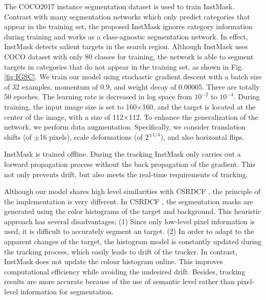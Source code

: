 \documentclass[review]{elsarticle}
\begin{document}
\begin{CJK*}{UTF8}{gbsn}
The COCO2017 \cite{Lin2014MicrosoftCC} instance segmentation dataset is used to train InstMask.
Contrast with many segmentation networks which only predict categories that appear in the training set, the proposed InstMask ignores category information during training and works as a class-agnostic segmentation network. In effect, InstMask detects salient targets in the search region. Although InstMask uses COCO dataset \cite{Lin2014MicrosoftCC} with only 80 classes for training, the network is able to segment targets in categories that do not appear in the training set, as shown in Fig. \ref{fig:IGSC}.
We train our model using stochastic gradient descent with a batch size of 32 examples, momentum of 0.9, and weight decay of 0.00005. There are totally 50 epoches. The learning rate is decreased in log space from $10^{-2}$ to $10^{-4}$. During training, the input image size is set to 160$\times$160, and the target is located at the center of the image, with a size of 112$\times$112. To enhance the generalization of the network, we perform data augmentation. Specifically, we consider translation shifts (of $\pm$16 pixels), scale deformations (of $2^{\pm 1/4}$), and also horizontal flips.

InstMask is trained offline. During the tracking InstMask only carries out a forward propagation process without the back propagation of the gradient. This not only prevents drift, but also meets the real-time requirements of tracking.

Although our model shares high level similarities with CSRDCF \cite{Lukezic2017DiscriminativeCF}, the principle of the implementation is very different.
In CSRDCF \cite{Lukezic2017DiscriminativeCF}, the segmentation masks are generated using the color histograms of the target and background. This heuristic approach has several disadvantages: (1) Since only low-level pixel information is used, it is difficult to accurately segment an target. (2) In order to adapt to the apparent changes of the target, the histogram model is constantly updated during the tracking process, which easily leads to drift of the tracker. In contrast, InstMask does not update the colour histogram online. This improves computational efficiency while avoiding the undesired drift. Besides, tracking results are more accurate because of the use of semantic level rather than pixel-level information for segmentation.


\end{CJK*}
\end{document}
